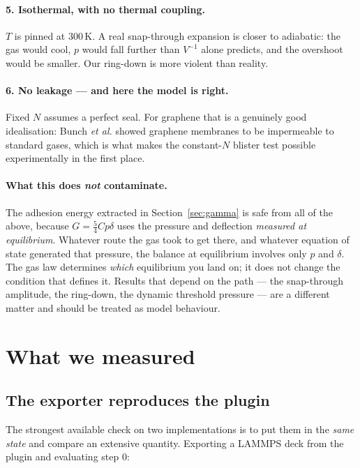 \documentclass[11pt,a4paper]{article}
\begin{document}
\paragraph{5. Isothermal, with no thermal coupling.} $T$ is pinned at 300\,K.
A real snap-through expansion is closer to adiabatic: the gas would cool, $p$
would fall further than $V^{-1}$ alone predicts, and the overshoot would be
smaller. Our ring-down is more violent than reality.

\paragraph{6. No leakage --- and here the model is right.} Fixed $N$ assumes a
perfect seal. For graphene that is a genuinely good idealisation: Bunch
\textit{et al.} showed graphene membranes to be impermeable to standard gases,
which is what makes the constant-$N$ blister test possible experimentally in the
first place.

\paragraph{What this does \emph{not} contaminate.} The adhesion energy extracted
in Section~\ref{sec:gamma} is safe from all of the above, because
$G = \tfrac54 C p \delta$ uses the pressure and deflection \emph{measured at
equilibrium}. Whatever route the gas took to get there, and whatever equation of
state generated that pressure, the balance at equilibrium involves only $p$ and
$\delta$. The gas law determines \emph{which} equilibrium you land on; it does
not change the condition that defines it. Results that depend on the path ---
the snap-through amplitude, the ring-down, the dynamic threshold pressure ---
are a different matter and should be treated as model behaviour.

\section{What we measured}

\subsection{The exporter reproduces the plugin}

The strongest available check on two implementations is to put them in the
\emph{same state} and compare an extensive quantity. Exporting a LAMMPS deck
from the plugin and evaluating step 0:
\end{document}
